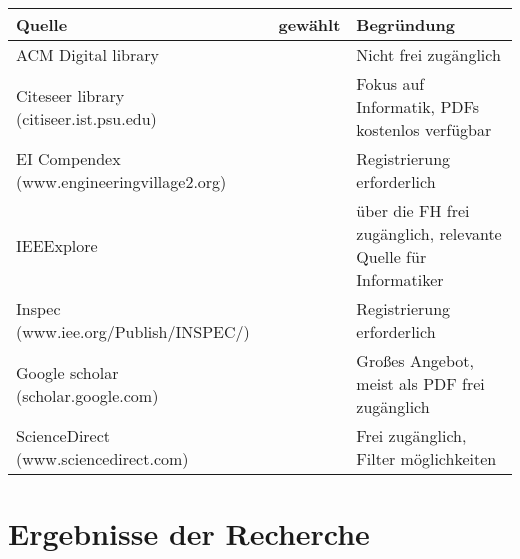 \begin{tabular}[]{|L{6cm}|l|L{6cm}|}
	\hline
	 \textbf{Quelle} & \textbf{gewählt} & \textbf{Begründung} \\ 
	\hline
	ACM Digital library & \redX & Nicht frei zugänglich \\ 
	\hline
	Citeseer library (citiseer.ist.psu.edu) & \greenchecked & Fokus auf Informatik, PDFs kostenlos verfügbar \\ 
	\hline
	EI Compendex (www.engineeringvillage2.org) & \redX & Registrierung erforderlich \\ 
	\hline
	IEEExplore & \greenchecked & über die FH frei zugänglich, relevante Quelle für Informatiker \\ 
	\hline
	Inspec (www.iee.org/Publish/INSPEC/) & \redX & Registrierung erforderlich \\ 
	\hline
	Google scholar (scholar.google.com) & \greenchecked & Großes Angebot, meist als PDF frei zugänglich \\ 
	\hline
	ScienceDirect (www.sciencedirect.com) & \greenchecked & Frei zugänglich, Filter möglichkeiten \\
	\hline
\end{tabular} 

\section{Ergebnisse der Recherche}
\label{sec:ergebnisseDerRecherche}

